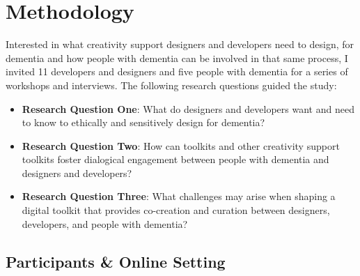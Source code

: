 
\section{Methodology}
\label{D3:Methodology}
Interested in what creativity support designers and developers need to design, for dementia and how people with dementia can be involved in that same process, I invited 11 developers and designers and five people with dementia for a series of workshops and interviews. The following research questions guided the study:
\begin{itemize}
    \item \textbf{Research Question One}: What do designers and developers want and need to know to ethically and sensitively design for dementia?
    \item \textbf{Research Question Two}: How can toolkits and other creativity support toolkits foster dialogical engagement between people with dementia and designers and developers?
    \item \textbf{Research Question Three}: What challenges may arise when shaping a digital toolkit that provides co-creation and curation between designers, developers, and people with dementia?
\end{itemize}

\subsection{Participants \& Online Setting}
